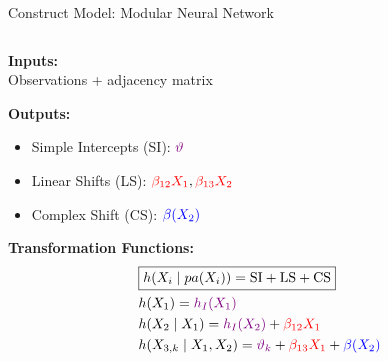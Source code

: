 \documentclass[onlytextwidth,english]{beamer}\usepackage[]{graphicx}\usepackage[]{xcolor}
\begin{document}
\begin{frame}{Construct Model: Modular Neural Network}

\begin{columns}

\begin{column}{0.65\textwidth}

\vspace{0.1cm}

\textbf{Inputs:} \\ Observations + adjacency matrix

\vspace{0.4cm}

\textbf{Outputs:}
\begin{itemize}
    \item Simple Intercepts (SI): $\textcolor{violet}{\vartheta}$
    \item Linear Shifts (LS): $\textcolor{red}{\beta_{12}X_1}, \textcolor{red}{\beta_{13}X_2}$
    \item Complex Shift (CS):  $\textcolor{blue}{\beta(X_2)}$
\end{itemize}

\vspace{0.4cm}
\textbf{Transformation Functions:}
\begin{align*}
& \boxed{h(X_i \mid pa(X_i)) = \text{SI} + \text{LS} + \text{CS}} \\
& h(X_1) = \textcolor{violet}{h_I(X_1)} \\
& h(X_2 \mid X_1) = \textcolor{violet}{h_I(X_2)} + \textcolor{red}{\beta_{12} X_1} \\
& h(X_{3,k} \mid X_1, X_2) = \textcolor{violet}{\vartheta_k} + \textcolor{red}{\beta_{13} X_1} + \textcolor{blue}{\beta(X_2)} 
\end{align*}

\end{column}


\end{columns}
\end{frame}
\end{document}
